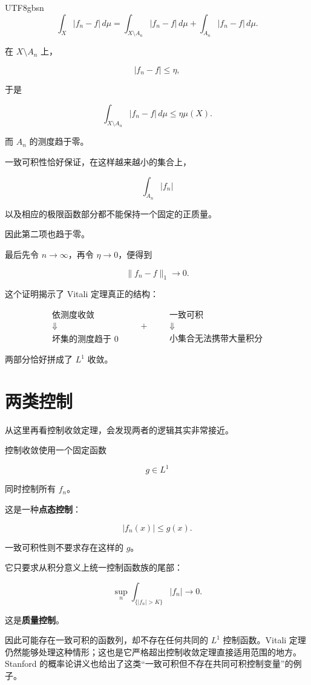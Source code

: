 \documentclass[11pt]{article}
\begin{document}
\begin{CJK*}{UTF8}{gbsn}
\[
\int_X|f_n-f|\,d\mu
=
\int_{X\setminus A_n}|f_n-f|\,d\mu
+
\int_{A_n}|f_n-f|\,d\mu.
\]

在 $X\setminus A_n$ 上，

\[
|f_n-f|\leq\eta,
\]

于是

\[
\int_{X\setminus A_n}|f_n-f|\,d\mu
\leq
\eta\mu(X).
\]

而 $A_n$ 的测度趋于零。

一致可积性恰好保证，在这样越来越小的集合上，

\[
\int_{A_n}|f_n|
\]

以及相应的极限函数部分都不能保持一个固定的正质量。

因此第二项也趋于零。

最后先令 $n\to\infty$，再令 $\eta\to0$，便得到

\[
\|f_n-f\|_1\to0.
\]

这个证明揭示了 Vitali 定理真正的结构：

\[
\boxed{
\begin{array}{c}
\text{依测度收敛}\\
\Downarrow\\
\text{坏集的测度趋于 }0
\end{array}
\qquad+\qquad
\begin{array}{c}
\text{一致可积}\\
\Downarrow\\
\text{小集合无法携带大量积分}
\end{array}
}
\]

两部分恰好拼成了 $L^1$ 收敛。


\section{两类控制}


从这里再看控制收敛定理，会发现两者的逻辑其实非常接近。

控制收敛使用一个固定函数

\[
g\in L^1
\]

同时控制所有 $f_n$。

这是一种\textbf{点态控制}：

\[
|f_n(x)|\leq g(x).
\]

一致可积性则不要求存在这样的 $g$。

它只要求从积分意义上统一控制函数族的尾部：

\[
\sup_n
\int_{\{|f_n|>K\}}|f_n|
\to0.
\]

这是\textbf{质量控制}。

因此可能存在一致可积的函数列，却不存在任何共同的 $L^1$ 控制函数。Vitali 定理仍然能够处理这种情形；这也是它严格超出控制收敛定理直接适用范围的地方。Stanford 的概率论讲义也给出了这类“一致可积但不存在共同可积控制变量”的例子。


\end{CJK*}
\end{document}
